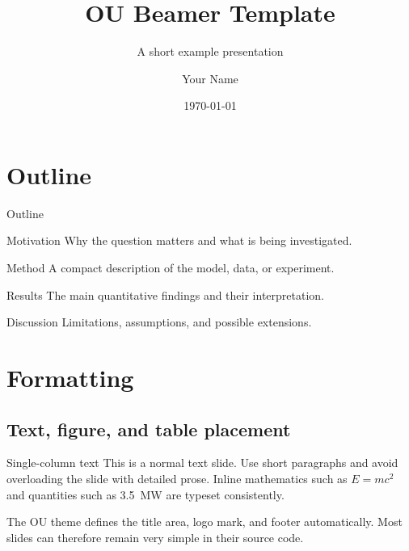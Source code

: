 \documentclass[10pt,aspectratio=169]{beamer}
\title[OU Beamer Template]{OU Beamer Template}
\subtitle{A short example presentation}
\author{Your Name}
\date{\today}
\begin{document}
\begin{frame}
  \titlepage
\end{frame}

\section{Outline}
\begin{frame}[t]{Outline}

\vspace{-0.65cm}
\begin{ououtline}
  \item Motivation
  \itemdetails Why the question matters and what is being investigated.
  \item Method
  \itemdetails A compact description of the model, data, or experiment.
  \item Results
  \itemdetails The main quantitative findings and their interpretation.
  \item Discussion
  \itemdetails Limitations, assumptions, and possible extensions.
\end{ououtline}
\end{frame}

\section{Formatting}
\subsection{Text, figure, and table placement}
\begin{frame}[t]{Single-column text}
This is a normal text slide. Use short paragraphs and avoid overloading the slide with detailed prose. Inline mathematics such as \(E=mc^2\) and quantities such as \qty{3.5}{MW} are typeset consistently.

\medskip
The OU theme defines the title area, logo mark, and footer automatically. Most slides can therefore remain very simple in their source code.
\end{frame}
\end{document}
